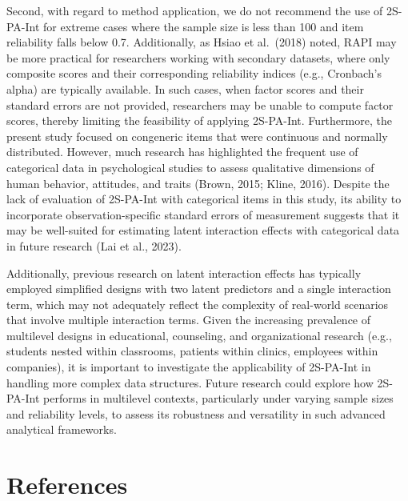 \documentclass[
  man]{apa6}
\begin{document}
Second, with regard to method application, we do not recommend the use of 2S-PA-Int for extreme cases where the sample size is less than 100 and item reliability falls below 0.7. Additionally, as Hsiao et al.~(2018) noted, RAPI may be more practical for researchers working with secondary datasets, where only composite scores and their corresponding reliability indices (e.g., Cronbach's alpha) are typically available. In such cases, when factor scores and their standard errors are not provided, researchers may be unable to compute factor scores, thereby limiting the feasibility of applying 2S-PA-Int. Furthermore, the present study focused on congeneric items that were continuous and normally distributed. However, much research has highlighted the frequent use of categorical data in psychological studies to assess qualitative dimensions of human behavior, attitudes, and traits (Brown, 2015; Kline, 2016). Despite the lack of evaluation of 2S-PA-Int with categorical items in this study, its ability to incorporate observation-specific standard errors of measurement suggests that it may be well-suited for estimating latent interaction effects with categorical data in future research (Lai et al., 2023).

Additionally, previous research on latent interaction effects has typically employed simplified designs with two latent predictors and a single interaction term, which may not adequately reflect the complexity of real-world scenarios that involve multiple interaction terms. Given the increasing prevalence of multilevel designs in educational, counseling, and organizational research (e.g., students nested within classrooms, patients within clinics, employees within companies), it is important to investigate the applicability of 2S-PA-Int in handling more complex data structures. Future research could explore how 2S-PA-Int performs in multilevel contexts, particularly under varying sample sizes and reliability levels, to assess its robustness and versatility in such advanced analytical frameworks.

\newpage

\section{References}\label{references}
\end{document}
